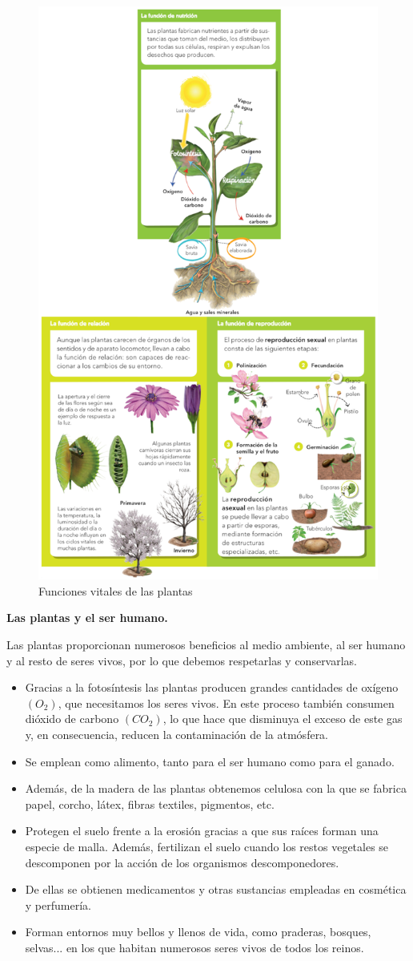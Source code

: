 \begin{figure}[!ht]
    \centering
    \includegraphics[width=0.7\linewidth]{Tema1/14_Funciones_plantas.png}
    \caption{Funciones vitales de las plantas}
    \label{fig:funciones-plantas}
\end{figure}
\textbf{Las plantas y el ser humano.}

\vspace{3mm}
Las plantas proporcionan numerosos beneficios al medio ambiente, al ser humano y al resto de seres vivos, por lo que debemos respetarlas y conservarlas.
\begin{itemize}
    \item Gracias a la fotosíntesis las plantas producen grandes cantidades de oxígeno $(O_2)$, que necesitamos los seres vivos. En este proceso también consumen dióxido de carbono $(CO_2)$, lo que hace que disminuya el exceso de este gas y, en consecuencia, reducen la contaminación de la atmósfera.
    \item Se emplean como alimento, tanto para el ser humano como para el ganado.
    \item Además, de la madera de las plantas obtenemos celulosa con la que se fabrica papel, corcho, látex, fibras textiles, pigmentos, etc.
    \item Protegen el suelo frente a la erosión gracias a que sus raíces forman una especie de malla. Además, fertilizan el suelo cuando los restos vegetales se descomponen por la acción de los organismos descomponedores.
    \item De ellas se obtienen medicamentos y otras sustancias empleadas en cosmética y perfumería.
    \item Forman entornos muy bellos y llenos de vida, como praderas, bosques, selvas... en los que habitan numerosos seres vivos de todos los reinos.
\end{itemize}
